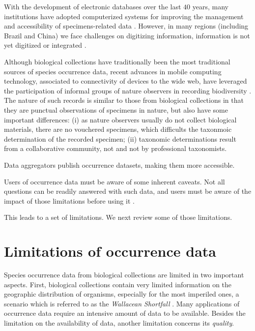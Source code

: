With the development of electronic databases over the last $40$ years, many institutions have adopted computerized systems for improving the management and accessibility of specimens-related data \cite{Sunderland2013}.
However, in many regions (including Brazil and China) we face challenges on digitizing information, information is not yet digitized or integrated \cite{Meyer2016}.


Although biological collections have traditionally been the most traditional sources of species occurrence data, recent advances in mobile computing technology, associated to connectivity of devices to the wide web, have leveraged the participation of informal groups of nature observers in recording biodiversity \cite{Silvertown2009}.
The nature of such records is similar to those from biological collections in that they are punctual observations of specimens in nature, but also have some important differences: (i) as nature observers usually do not collect biological materials, there are no vouchered specimens, which difficults the taxonmoic determination of the recorded specimen; (ii) taxonomic determinations result from a collaborative community, not and not by professional taxonomists. 






 

Data aggregators publish occurrence datasets, making them more accessible.

Users of occurrence data must be aware of some inherent caveats.
Not all questions can be readily answered with such data, and users must be aware of the impact of those limitations before using it .


This leads to a set of limitations.
We next review some of those limitations.

\section{Limitations of occurrence data}
Species occurrence data from biological collections are limited in two important aspects.
First, biological collections contain very limited information on the geographic distribution of organisms, especially for the most imperiled ones, a scenario which is referred to as the \textit{Wallacean Shortfall} \cite{Lomolino2004}.
Many applications of occurrence data require an intensive amount of data to be available.
%
Besides the limitation on the availability of data, another limitation concerns its \textit{quality}.



